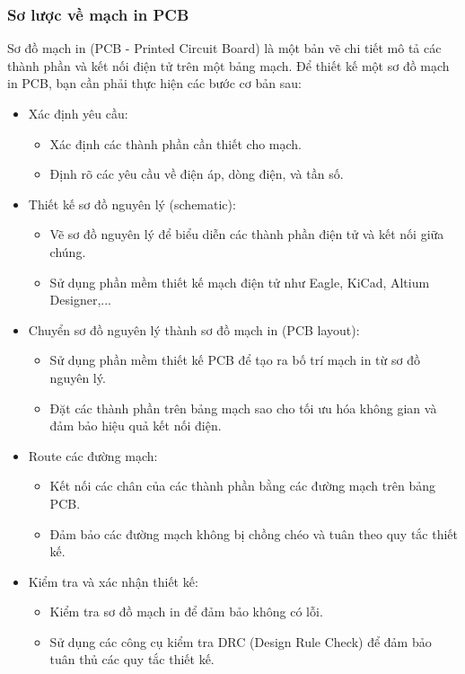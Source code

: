 \subsubsection{Sơ lược về mạch in PCB}
Sơ đồ mạch in (PCB - Printed Circuit Board) là một bản vẽ chi tiết mô tả các
thành phần và kết nối điện tử trên một bảng mạch. Để thiết kế một sơ đồ mạch in PCB,
bạn cần phải thực hiện các bước cơ bản sau: 
\begin{itemize}
    \item Xác định yêu cầu:
    \begin{itemize}
        \item Xác định các thành phần cần thiết cho mạch.
        \item Định rõ các yêu cầu về điện áp, dòng điện, và tần số.
    \end{itemize}
    \item Thiết kế sơ đồ nguyên lý (schematic):
    \begin{itemize}
        \item Vẽ sơ đồ nguyên lý để biểu diễn các thành phần điện tử và kết nối giữa chúng.
        \item Sử dụng phần mềm thiết kế mạch điện tử như Eagle, KiCad, Altium Designer,...
    \end{itemize}
    \item Chuyển sơ đồ nguyên lý thành sơ đồ mạch in (PCB layout):
    \begin{itemize}
        \item Sử dụng phần mềm thiết kế PCB để tạo ra bố trí mạch in từ sơ đồ nguyên lý.
        \item Đặt các thành phần trên bảng mạch sao cho tối ưu hóa không gian và đảm bảo hiệu quả kết nối điện.
    \end{itemize}
    \item Route các đường mạch:
    \begin{itemize}
        \item Kết nối các chân của các thành phần bằng các đường mạch trên bảng PCB.
        \item Đảm bảo các đường mạch không bị chồng chéo và tuân theo quy tắc thiết kế.
    \end{itemize}
    \item Kiểm tra và xác nhận thiết kế:
    \begin{itemize}
        \item Kiểm tra sơ đồ mạch in để đảm bảo không có lỗi.
        \item Sử dụng các công cụ kiểm tra DRC (Design Rule Check) để đảm bảo tuân thủ các quy tắc thiết kế.

\end{itemize}
\end{itemize}
